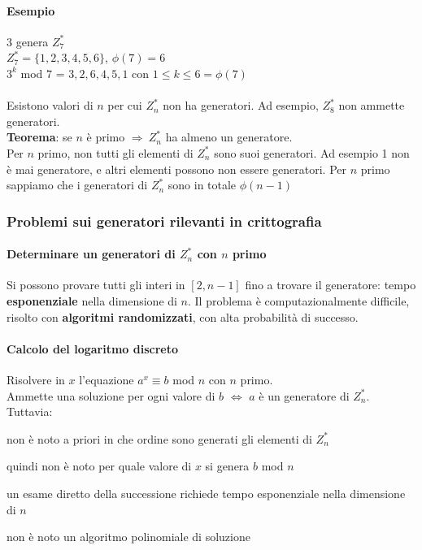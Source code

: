 \documentclass[10pt]{book}
\begin{document}
\paragraph{Esempio} $3$ genera $Z_7^*$\\
$Z_7^* = \{1, 2, 3, 4, 5, 6\}$, $\phi(7) = 6$\\
$3^k$ mod $7$ = $3, 2, 6, 4, 5, 1$ con $1 \leq k \leq 6 = \phi(7)$\\\\
Esistono valori di $n$ per cui $Z_n^*$ non ha generatori. Ad esempio, $Z_8^*$ non ammette generatori.\\
\textbf{Teorema}: se $n$ è primo $\Rightarrow\:Z_n^*$ ha almeno un generatore.\\
Per $n$ primo, non tutti gli elementi di $Z_n^*$ sono suoi generatori. Ad esempio 1 non è mai generatore, e altri elementi possono non essere generatori. Per $n$ primo sappiamo che i generatori di $Z_n^*$ sono in totale $\phi(n-1)$
\subsubsection{Problemi sui generatori rilevanti in crittografia}
\paragraph{Determinare un generatori di $Z_n^*$ con $n$ primo}
Si possono provare tutti gli interi in $[2, n-1]$ fino a trovare il generatore: tempo \textbf{esponenziale} nella dimensione di $n$. Il problema è computazionalmente difficile, risolto con \textbf{algoritmi randomizzati}, con alta probabilità di successo.
\paragraph{Calcolo del logaritmo discreto} Risolvere in $x$ l'equazione $a^x \equiv b$ mod $n$ con $n$ primo.\\
Ammette una soluzione per ogni valore di $b$ $\Leftrightarrow$ $a$ è un generatore di $Z_n^*$. Tuttavia:
\begin{list}{}{}
	\item non è noto a priori in che ordine sono generati gli elementi di $Z_n^*$
	\item quindi non è noto per quale valore di $x$ si genera $b$ mod $n$
	\item un esame diretto della successione richiede tempo esponenziale nella dimensione di $n$
	\item non è noto un algoritmo polinomiale di soluzione
\end{list}
\end{document}
